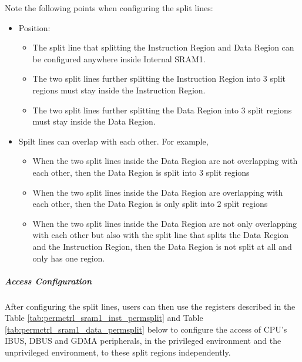 \documentclass[main\_\_EN.tex]{subfiles}
\begin{document}
Note the following points when configuring the split lines:

 \begin{itemize}
     \item Position:
     \begin{itemize}
         \item The split line that splitting the Instruction Region and Data Region can be configured anywhere inside Internal SRAM1.
         \item The two split lines further splitting the Instruction Region into 3 split regions must stay inside the Instruction Region.
         \item The two split lines further splitting the Data Region into 3 split regions must stay inside the Data Region.
     \end{itemize}
     \item Spilt lines can overlap with each other. For example,
     \begin{itemize}
         \item When the two split lines inside the Data Region are not overlapping with each other, then the Data Region is split into 3 split regions
         \item When the two split lines inside the Data Region are overlapping with each other, then the Data Region is only split into 2 split regions
         \item When the two split lines inside the Data Region are not only overlapping with each other but also with the split line that splits the Data Region and the Instruction Region, then the Data Region is not split at all and only has one region.
     \end{itemize}
     \end{itemize}

\subparagraph{Access Configuration}

After configuring the split lines, users can then use the registers described in the Table \ref{tab:permctrl_sram1_inst_permsplit} and Table \ref{tab:permctrl_sram1_data_permsplit} below to configure the access of CPU's IBUS, DBUS and GDMA peripherals, in the privileged environment and the unprivileged environment, to these split regions independently.
\end{document}
